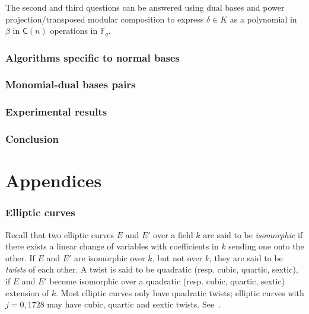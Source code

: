 \documentclass[12pt]{article}
\theoremstyle{plain}
\theoremstyle{definition}
\def\F{\ensuremath{\mathbb{F}}}
\def\CC{\ensuremath{\mathsf{C}}}
\begin{document}
The second and third questions can be answered using
dual bases and power projection/transposed modular composition
to express $\delta \in K$ as a polynomial in $\beta$ in
$\CC(n)$ operations in $\F_q$.



\section{Algorithms specific to normal bases}


\section{Monomial-dual bases pairs}


\section{Experimental results}


\section{Conclusion}


\appendix
\part*{Appendices}


\section{Elliptic curves}
\label{app:elliptic-curves}

Recall that two elliptic curves $E$ and $E'$ over a field $k$ are said
to be \emph{isomorphic} if there exists a linear change of variables
with coefficients in $k$ sending one onto the other. If $E$ and $E'$
are isomorphic over $\bar{k}$, but not over $k$, they are said to be
\emph{twists} of each other. A twist is said to be quadratic
(resp. cubic, quartic, sextic), if $E$ and $E'$ become isomorphic over
a quadratic (resp. cubic, quartic, sextic) extension of $k$. Most
elliptic curves only have quadratic twists; elliptic curves with
$j=0,1728$ may have cubic, quartic and sextic twists. See~\cite{Sil}.
\end{document}

